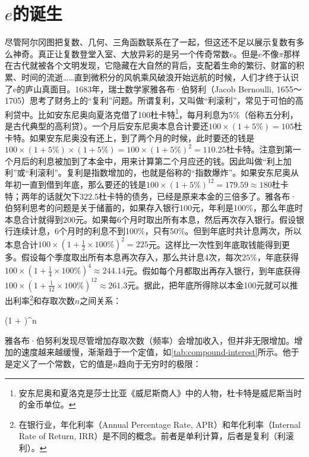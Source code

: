 \documentclass[b5paper]{ctexart}
\begin{document}

\section{$e$的诞生}

 
尽管阿尔冈图把复数、几何、三角函数联系在了一起，但这还不足以展示复数有多么神奇。真正让复数登堂入室、大放异彩的是另一个传奇常数$e$。但是$e$不像$\pi$那样在古代就被各个文明发现，它隐藏在大自然的背后，支配着生命的繁衍、财富的积累、时间的流逝……直到微积分的风帆乘风破浪开始远航的时候，人们才终于认识了e的庐山真面目。1683年，瑞士数学家雅各布·伯努利（Jacob Bernoulli, 1655～1705）思考了财务上的“复利”问题。所谓复利，又叫做“利滚利”，常见于可怕的高利贷中。比如安东尼奥向夏洛克借了100杜卡特\footnote{安东尼奥和夏洛克是莎士比亚《威尼斯商人》中的人物，杜卡特是威尼斯当时的金币单位。}，每月利息为5\%（俗称五分利，是古代典型的高利贷）。一个月后安东尼奥本息合计要还$100 \times (1 + 5\%) = 105$杜卡特。如果安东尼奥没有还上，到了两个月的时候，此时要还的钱是$100 \times (1 + 5\%) \times (1 + 5\%) = 100 \times (1 + 5\%)^2 = 110.25$杜卡特。注意到第一个月后的利息被加到了本金中，用来计算第二个月应还的钱。因此叫做“利上加利”或“利滚利”。复利是指数增加的，也就是俗称的“指数爆炸”。如果安东尼奥从年初一直到借到年底，那么要还的钱是$100 \times (1 + 5\%)^{12} = 179.59 \approx 180$杜卡特；两年的话就欠下$322.5$杜卡特的债务，已经是原来本金的三倍多了。雅各布·伯努利思考的问题是关于储蓄的，如果存入银行100元，年利是100\%，那么年底时本息合计就得到$200$元。如果每6个月时取出所有本息，然后再次存入银行。假设银行连续计息，6个月时的利息不到100\%，只有50\%。但到年底时共计息两次，所以本息合计$100 \times (1 + \frac{1}{2}\times 100\%)^2 = 225$元。这样比一次性到年底取钱能得到更多。假设每个季度取出所有本息再次存入，那么共计息4次，每次$25\%$，年底获得$100 \times (1 + \frac{1}{4} \times 100\%)^4 \approx 244.14$元。假如每个月都取出再存入银行，到年底获得$100 \times (1 + \frac{1}{12} \times 100\%)^{12} \approx 261.3$元。据此，把年底所得除以本金100元就可以推出利率\footnote{在银行业，年化利率（Annual Percentage Rate, APR）和年化利率（Internal Rate of Return, IRR）是不同的概念。前者是单利计算，后者是复利（利滚利）。}和存取次数$n$之间关系：

\be
(1 + )^n
\ee

雅各布·伯努利发现尽管增加存取次数（频率）会增加收入，但并非无限增加。增加的速度越来越缓慢，渐渐趋于一个定值，如\cref{tab:compound-interest}所示。他于是定义了一个常数，它的值是$n$趋向于无穷时的极限：
\end{document}
